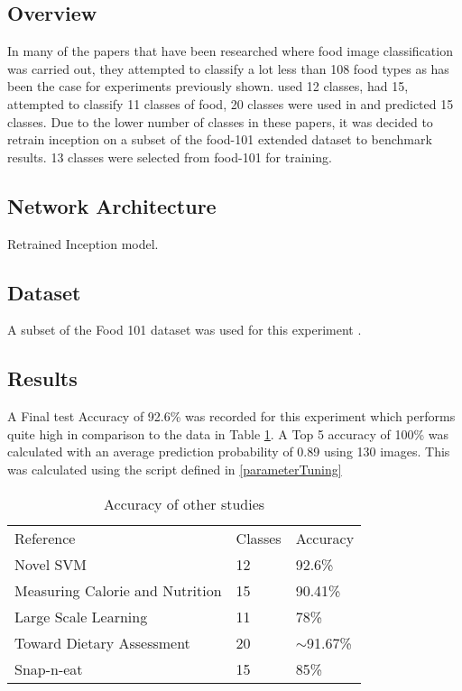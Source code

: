 \subsection*{Overview}
In many of the papers that have been researched where food image classification was carried out, they attempted to classify a lot less than 108 food types as has been the case for experiments previously shown.
\textcite{novelSVM} used 12 classes, \textcite{pouladzadeh2014measuring} had 15, \textcite{LSL_2015} attempted to classify 11 classes of food, 20 classes were used in \textcite{chen2010toward} and \textcite{snap} predicted 15 classes.
Due to the lower number of classes in these papers, it was decided to retrain inception on a subset of the food-101 extended dataset to benchmark results.
13 classes were selected from food-101 for training.

\subsection*{Network Architecture}
Retrained Inception model.

\subsection*{Dataset}
A subset of the Food 101 dataset was used for this experiment \textcite{food101}.

\subsection*{Results}
A Final test Accuracy of 92.6\% was recorded for this experiment which performs quite high in comparison to the data in Table \ref{classes_accuracy}.
A Top 5 accuracy of 100\% was calculated with an average prediction probability of 0.89 using 130 images.
This was calculated using the script defined in \ref{parameterTuning}

\begin{table}[]
\centering
\caption{Accuracy of other studies}
\label{classes_accuracy}
\begin{tabular}{lll}
Reference                       & Classes & Accuracy      \\
Novel SVM                       & 12      & 92.6\%        \\
Measuring Calorie and Nutrition & 15      & 90.41\%       \\
Large Scale Learning            & 11      & 78\%          \\
Toward Dietary Assessment       & 20      & $\sim$91.67\% \\
Snap-n-eat                      & 15      & 85\%         
\end{tabular}
\end{table}

